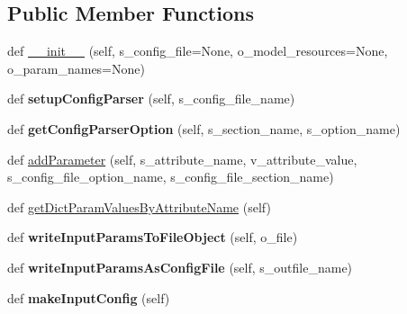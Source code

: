 \subsection*{Public Member Functions}
\begin{DoxyCompactItemize}
\item 
def \hyperlink{classnegui_1_1pginputsimupop_1_1PGInputSimuPop_a1452a83a005c9d30e778b34ae67a399f}{\+\_\+\+\_\+init\+\_\+\+\_\+} (self, s\+\_\+config\+\_\+file=None, o\+\_\+model\+\_\+resources=None, o\+\_\+param\+\_\+names=None)
\item 
def {\bfseries setup\+Config\+Parser} (self, s\+\_\+config\+\_\+file\+\_\+name)\hypertarget{classnegui_1_1pginputsimupop_1_1PGInputSimuPop_a3f1295816cd5e708646d49e1d4f3fb1c}{}\label{classnegui_1_1pginputsimupop_1_1PGInputSimuPop_a3f1295816cd5e708646d49e1d4f3fb1c}

\item 
def {\bfseries get\+Config\+Parser\+Option} (self, s\+\_\+section\+\_\+name, s\+\_\+option\+\_\+name)\hypertarget{classnegui_1_1pginputsimupop_1_1PGInputSimuPop_abe1cda382edb5f59e3c01f2bee5b63c8}{}\label{classnegui_1_1pginputsimupop_1_1PGInputSimuPop_abe1cda382edb5f59e3c01f2bee5b63c8}

\item 
def \hyperlink{classnegui_1_1pginputsimupop_1_1PGInputSimuPop_aa990ef0c582a28a456a355a4eb3af2b9}{add\+Parameter} (self, s\+\_\+attribute\+\_\+name, v\+\_\+attribute\+\_\+value, s\+\_\+config\+\_\+file\+\_\+option\+\_\+name, s\+\_\+config\+\_\+file\+\_\+section\+\_\+name)
\item 
def \hyperlink{classnegui_1_1pginputsimupop_1_1PGInputSimuPop_a099e2f01dabe86e713df7519a08fecca}{get\+Dict\+Param\+Values\+By\+Attribute\+Name} (self)
\item 
def {\bfseries write\+Input\+Params\+To\+File\+Object} (self, o\+\_\+file)\hypertarget{classnegui_1_1pginputsimupop_1_1PGInputSimuPop_affc2fd6bd54b8f1ed84801b2f7f2da4b}{}\label{classnegui_1_1pginputsimupop_1_1PGInputSimuPop_affc2fd6bd54b8f1ed84801b2f7f2da4b}

\item 
def {\bfseries write\+Input\+Params\+As\+Config\+File} (self, s\+\_\+outfile\+\_\+name)\hypertarget{classnegui_1_1pginputsimupop_1_1PGInputSimuPop_a6264dda65b65dc05f2bb32a1c0be103d}{}\label{classnegui_1_1pginputsimupop_1_1PGInputSimuPop_a6264dda65b65dc05f2bb32a1c0be103d}

\item 
def {\bfseries make\+Input\+Config} (self)\hypertarget{classnegui_1_1pginputsimupop_1_1PGInputSimuPop_ac76cae13dbe53f4b69e9c287ee3f753c}{}\label{classnegui_1_1pginputsimupop_1_1PGInputSimuPop_ac76cae13dbe53f4b69e9c287ee3f753c}


\end{DoxyCompactItemize}
